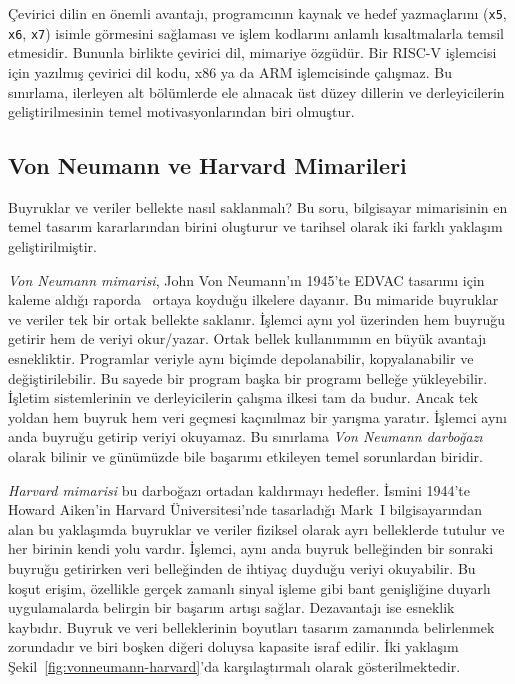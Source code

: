 Çevirici dilin en önemli avantajı, programcının kaynak ve hedef yazmaçlarını (\texttt{x5}, \texttt{x6}, \texttt{x7}) isimle görmesini sağlaması ve işlem kodlarını anlamlı kısaltmalarla temsil etmesidir. Bununla birlikte çevirici dil, mimariye özgüdür. Bir RISC-V işlemcisi için yazılmış çevirici dil kodu, x86 ya da ARM işlemcisinde çalışmaz. Bu sınırlama, ilerleyen alt bölümlerde ele alınacak üst düzey dillerin ve derleyicilerin geliştirilmesinin temel motivasyonlarından biri olmuştur.

\subsection{Von Neumann ve Harvard Mimarileri}
\label{subsec:vonneumann-harvard}

Buyruklar ve veriler bellekte nasıl saklanmalı? Bu soru, bilgisayar mimarisinin en temel tasarım kararlarından birini oluşturur ve tarihsel olarak iki farklı yaklaşım geliştirilmiştir.

\emph{Von Neumann mimarisi}, John Von Neumann'ın 1945'te EDVAC tasarımı için kaleme aldığı raporda~\cite{vonneumann1945} ortaya koyduğu ilkelere dayanır. Bu mimaride buyruklar ve veriler tek bir ortak bellekte saklanır. İşlemci aynı yol üzerinden hem buyruğu getirir hem de veriyi okur/yazar. Ortak bellek kullanımının en büyük avantajı esnekliktir. Programlar veriyle aynı biçimde depolanabilir, kopyalanabilir ve değiştirilebilir. Bu sayede bir program başka bir programı belleğe yükleyebilir. İşletim sistemlerinin ve derleyicilerin çalışma ilkesi tam da budur. Ancak tek yoldan hem buyruk hem veri geçmesi kaçınılmaz bir yarışma yaratır. İşlemci aynı anda buyruğu getirip veriyi okuyamaz. Bu sınırlama \emph{Von Neumann darboğazı} olarak bilinir ve günümüzde bile başarımı etkileyen temel sorunlardan biridir.

\emph{Harvard mimarisi} bu darboğazı ortadan kaldırmayı hedefler. İsmini 1944'te Howard Aiken'in Harvard Üniversitesi'nde tasarladığı Mark~I bilgisayarından alan bu yaklaşımda buyruklar ve veriler fiziksel olarak ayrı belleklerde tutulur ve her birinin kendi yolu vardır. İşlemci, aynı anda buyruk belleğinden bir sonraki buyruğu getirirken veri belleğinden de ihtiyaç duyduğu veriyi okuyabilir. Bu koşut erişim, özellikle gerçek zamanlı sinyal işleme gibi bant genişliğine duyarlı uygulamalarda belirgin bir başarım artışı sağlar. Dezavantajı ise esneklik kaybıdır. Buyruk ve veri belleklerinin boyutları tasarım zamanında belirlenmek zorundadır ve biri boşken diğeri doluysa kapasite israf edilir. İki yaklaşım Şekil~\ref{fig:vonneumann-harvard}'da karşılaştırmalı olarak gösterilmektedir.

